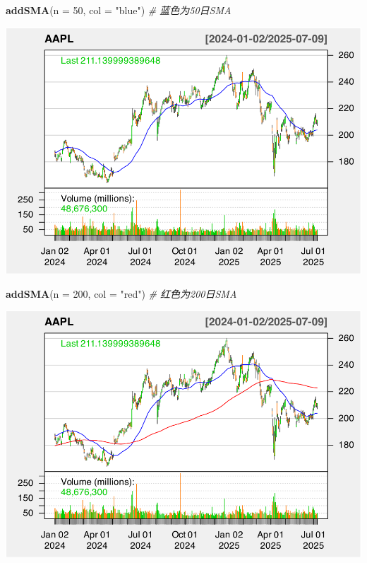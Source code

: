 \documentclass[]{ctexbook}
\newenvironment{Shaded}{\begin{snugshade}}{\end{snugshade}}
\newcommand{\AttributeTok}[1]{\textcolor[rgb]{0.13,0.29,0.53}{#1}}
\newcommand{\CommentTok}[1]{\textcolor[rgb]{0.56,0.35,0.01}{\textit{#1}}}
\newcommand{\DecValTok}[1]{\textcolor[rgb]{0.00,0.00,0.81}{#1}}
\newcommand{\FunctionTok}[1]{\textcolor[rgb]{0.13,0.29,0.53}{\textbf{#1}}}
\newcommand{\NormalTok}[1]{#1}
\newcommand{\StringTok}[1]{\textcolor[rgb]{0.31,0.60,0.02}{#1}}
\begin{document}
\begin{Shaded}
\begin{Highlighting}[]
\FunctionTok{addSMA}\NormalTok{(}\AttributeTok{n =} \DecValTok{50}\NormalTok{, }\AttributeTok{col =} \StringTok{"blue"}\NormalTok{)  }\CommentTok{\# 蓝色为50日SMA}
\end{Highlighting}
\end{Shaded}

\includegraphics[width=0.9\linewidth]{quantmod_files/figure-latex/sma_2-2}

\begin{Shaded}
\begin{Highlighting}[]
\FunctionTok{addSMA}\NormalTok{(}\AttributeTok{n =} \DecValTok{200}\NormalTok{, }\AttributeTok{col =} \StringTok{"red"}\NormalTok{)  }\CommentTok{\# 红色为200日SMA}
\end{Highlighting}
\end{Shaded}

\includegraphics[width=0.9\linewidth]{quantmod_files/figure-latex/sma_2-3}
\end{document}
